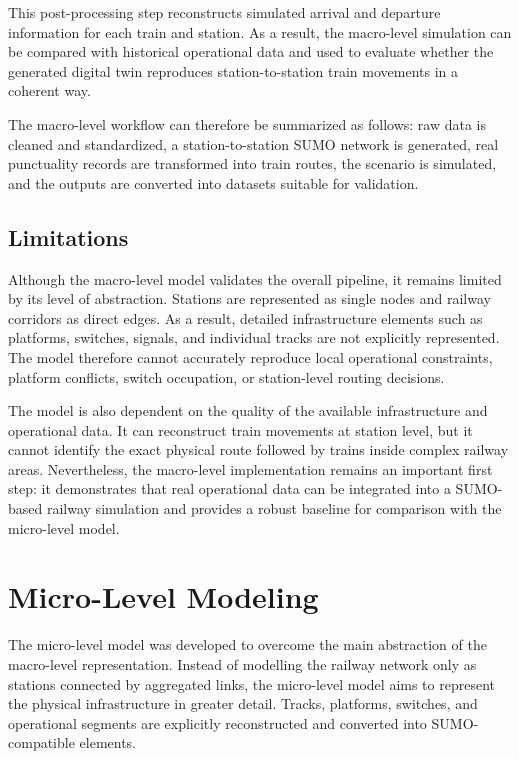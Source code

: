 This post-processing step reconstructs simulated arrival and departure information for each train and station. As a result, 
the macro-level simulation can be compared with historical operational data and used to evaluate whether the generated 
digital twin reproduces station-to-station train movements in a coherent way.

The macro-level workflow can therefore be summarized as follows: raw data is cleaned and standardized, a 
station-to-station SUMO network is generated, real punctuality records are transformed into train routes, the scenario is 
simulated, and the outputs are converted into datasets suitable for validation.


\subsection{Limitations}
Although the macro-level model validates the overall pipeline, it remains limited by its level of abstraction. Stations 
are represented as single nodes and railway corridors as direct edges. As a result, detailed infrastructure elements such 
as platforms, switches, signals, and individual tracks are not explicitly represented. The model therefore cannot 
accurately reproduce local operational constraints, platform conflicts, switch occupation, or station-level routing 
decisions.

The model is also dependent on the quality of the available infrastructure and operational data. It can reconstruct train 
movements at station level, but it cannot identify the exact physical route followed by trains inside complex railway 
areas. Nevertheless, the macro-level implementation remains an important first step: it demonstrates that real operational 
data can be integrated into a SUMO-based railway simulation and provides a robust baseline for comparison with the 
micro-level model.

\section{Micro-Level Modeling}
The micro-level model was developed to overcome the main abstraction of the macro-level representation. Instead of 
modelling the railway network only as stations connected by aggregated links, the micro-level model aims to represent the 
physical infrastructure in greater detail. Tracks, platforms, switches, and operational segments are explicitly 
reconstructed and converted into SUMO-compatible elements.

